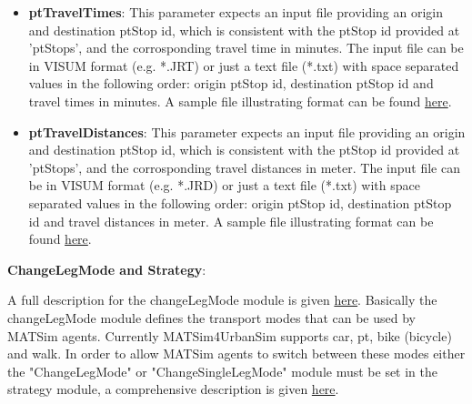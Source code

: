 \begin{itemize}
	\item \textbf{ptTravelTimes}: This parameter expects an input  file providing an origin and destination ptStop id, which is consistent  with the ptStop id provided at 'ptStops', and the corrosponding travel  time in minutes. The input file can be in VISUM format (e.g. *.JRT) or  just a text file (*.txt) with space separated values in the following  order: origin ptStop id, destination ptStop id and travel times in  minutes. A sample file illustrating format can be found \href{https://svn.vsp.tu-berlin.de/repos/public-svn/matsim/examples/countries/us/seattle/sampleTravelTimes.jrt}{here}.
	\item \textbf{ptTravelDistances}: This parameter expects an input  file providing an origin and destination ptStop id, which is consistent  with the ptStop id provided at 'ptStops', and the corrosponding travel  distances in meter. The input file can be in VISUM format (e.g. *.JRD)  or just a text file (*.txt) with space separated values in the following  order: origin ptStop id, destination ptStop id and travel distances in  meter. A sample file illustrating format can be found \href{https://svn.vsp.tu-berlin.de/repos/public-svn/matsim/examples/countries/us/seattle/sampleTravelTimes.jrt}{here}.
\end{itemize}


\textbf{ChangeLegMode and Strategy}:

A full description for the changeLegMode module is given \href{http://www.matsim.org/node/387}{here}.  Basically the changeLegMode module defines the transport modes that can  be used by MATSim agents. Currently MATSim4UrbanSim supports car, pt,  bike (bicycle) and walk. In order to allow MATSim agents to switch  between these modes either the "ChangeLegMode" or "ChangeSingleLegMode"  module must be set in the strategy module, a comprehensive description  is given \href{http://www.matsim.org/node/617}{here}.

